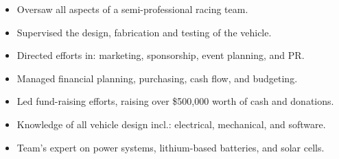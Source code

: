 \begin{entrylist}
{\begin{itemize}[leftmargin=12pt]
    \item Oversaw all aspects of a semi-professional racing team.
    \item Supervised the design, fabrication and testing of the vehicle.
    \item Directed efforts in: marketing, sponsorship, event planning, and PR.
    \item Managed financial planning, purchasing, cash flow, and budgeting.
    \item Led fund-raising efforts, raising over \$500,000 worth of cash and donations.
    \item Knowledge of all vehicle design incl.: electrical, mechanical, and software.
    \item Team’s expert on power systems, lithium-based batteries, and solar cells.
  \end{itemize}
}
\end{entrylist}